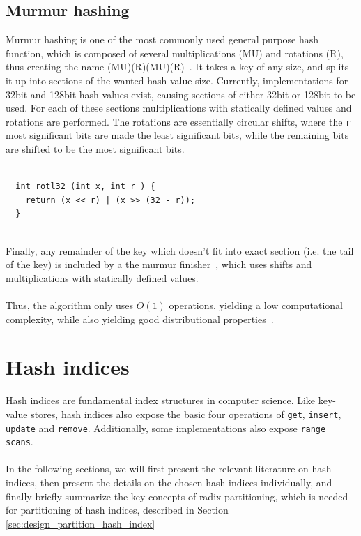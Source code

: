 \documentclass[11pt]{report} %
\begin{document}
\subsection{Murmur hashing}
\label{subsec:background_murmur_hashing}
Murmur hashing is one of the most commonly used general purpose hash function, which is composed of several multiplications (MU) and rotations (R), thus creating the name (MU)(R)(MU)(R)~\cite{Mur3}. It takes a key of any size, and splits it up into sections of the wanted hash value size. Currently, implementations for 32bit and 128bit hash values exist, causing sections of either 32bit or 128bit to be used. For each of these sections multiplications with statically defined values and rotations are performed. The rotations are essentially circular shifts, where the \verb|r| most significant bits are made the least significant bits, while the remaining bits are shifted to be the most significant bits.\\
\\
\begin{fminipage}{\linewidth}
\begin{lstlisting}
  int rotl32 (int x, int r ) {
    return (x << r) | (x >> (32 - r));
  }
\end{lstlisting}
\end{fminipage}
\vphantom{fill}\\
Finally, any remainder of the key which doesn't fit into exact section (i.e. the tail of the key) is included by a the murmur finisher~\cite{Mur3}, which uses shifts and multiplications with statically defined values.\\
\\
Thus, the algorithm only uses $O(1)$ operations, yielding a low computational complexity, while also yielding good distributional properties~\cite{RAD15}.
\section{Hash indices}
\label{sec:background_hashing_indices}
Hash indices are fundamental index structures in computer science. Like key-value stores, hash indices also expose the basic four operations of \verb|get|, \verb|insert|, \verb|update| and \verb|remove|. Additionally, some implementations also expose \verb|range scans|. \\
\\
In the following sections, we will first present the relevant literature on hash indices, then present the details on the chosen hash indices individually, and finally briefly summarize the key concepts of radix partitioning, which is needed for partitioning of hash indices, described in Section \ref{sec:design_partition_hash_index}
\end{document}
